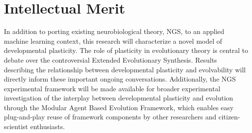 \section{Intellectual Merit}

In addition to porting existing neurobiological theory, NGS, to an applied machine learning context, this research will characterize a novel model of developmental plasticity.
The role of plasticity in evolutionary theory is central to debate over the controversial Extended Evolutionary Synthesis.\autocite{Laland2014DoesRethink}
Results describing the relationship between developmental plasticity and evolvability will directly inform these important ongoing conversations.
Additionally, the NGS experimental framework will be made available for broader experimental investigation of the interplay between developmental plasticity and evolution through the Modular Agent Based Evolution Framework, which enables easy plug-and-play reuse of framework components by other researchers and citizen-scientist enthusiasts.\autocite{Hintze2017Mabe}

